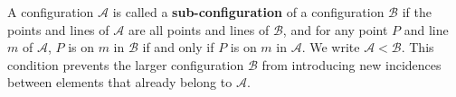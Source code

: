 A configuration $\mathcal{A}$ is called a \textbf{sub-configuration} of a configuration $\mathcal{B}$ if the points and lines of $\mathcal{A}$ are all points and lines of $\mathcal{B}$, and for any point $P$ and line $m$ of $\mathcal{A}$, $P$ is on $m$ in $\mathcal{B}$ if and only if $P$ is on $m$ in $\mathcal{A}$. We write $\mathcal{A} < \mathcal{B}$. This condition prevents the larger configuration $\mathcal{B}$ from introducing new incidences between elements that already belong to $\mathcal{A}$.
